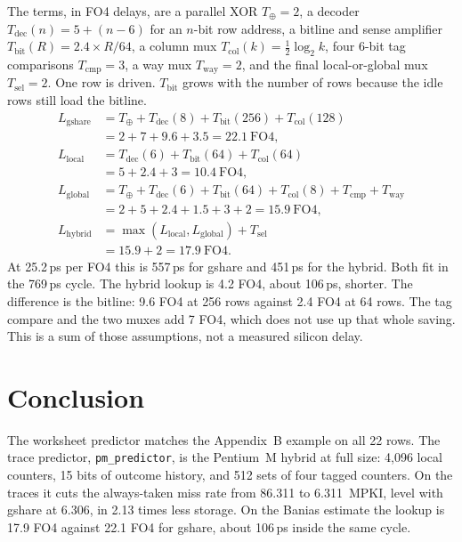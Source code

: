\documentclass[11pt]{article}
\begin{document}
The terms, in FO4 delays, are a parallel XOR \(T_{\oplus}=2\), a decoder
\(T_{\mathrm{dec}}(n)=5+(n-6)\) for an \(n\)-bit row address, a bitline and
sense amplifier \(T_{\mathrm{bit}}(R)=2.4\times R/64\), a column mux
\(T_{\mathrm{col}}(k)=\frac{1}{2}\log_2 k\), four 6-bit tag comparisons
\(T_{\mathrm{cmp}}=3\), a way mux \(T_{\mathrm{way}}=2\), and the final
local-or-global mux \(T_{\mathrm{sel}}=2\). One row is driven.
\(T_{\mathrm{bit}}\) grows with the number of rows because the idle rows
still load the bitline.
\begin{align}
L_{\mathrm{gshare}} &= T_{\oplus}+T_{\mathrm{dec}}(8)+T_{\mathrm{bit}}(256)+T_{\mathrm{col}}(128) \nonumber\\
&= 2+7+9.6+3.5 = 22.1~\text{FO4}, \\
L_{\mathrm{local}} &= T_{\mathrm{dec}}(6)+T_{\mathrm{bit}}(64)+T_{\mathrm{col}}(64) \nonumber\\
&= 5+2.4+3 = 10.4~\text{FO4}, \\
L_{\mathrm{global}} &= T_{\oplus}+T_{\mathrm{dec}}(6)+T_{\mathrm{bit}}(64)+T_{\mathrm{col}}(8)+T_{\mathrm{cmp}}+T_{\mathrm{way}} \nonumber\\
&= 2+5+2.4+1.5+3+2 = 15.9~\text{FO4}, \\
L_{\mathrm{hybrid}} &= \max(L_{\mathrm{local}},L_{\mathrm{global}})+T_{\mathrm{sel}} \nonumber\\
&= 15.9+2 = 17.9~\text{FO4}.
\end{align}
At 25.2\,ps per FO4 this is 557\,ps for gshare and 451\,ps for the hybrid.
Both fit in the 769\,ps cycle. The hybrid lookup is 4.2 FO4, about 106\,ps,
shorter. The difference is the bitline: 9.6 FO4 at 256 rows against 2.4 FO4
at 64 rows. The tag compare and the two muxes add 7 FO4, which does not use
up that whole saving. This is a sum of those assumptions, not a measured
silicon delay.

\section{Conclusion}

The worksheet predictor matches the Appendix~B example on all 22 rows. The
trace predictor, \texttt{pm\_predictor}, is the Pentium~M hybrid at full size: 4,096 local counters,
15 bits of outcome history, and 512 sets of four tagged counters. On the
traces it cuts the always-taken miss rate from 86.311 to 6.311~MPKI, level
with gshare at 6.306, in 2.13 times less storage. On the Banias estimate
the lookup is 17.9 FO4 against 22.1 FO4 for gshare, about 106\,ps inside the
same cycle.
\end{document}
